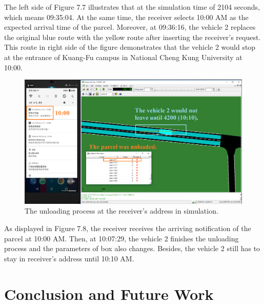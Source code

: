 \documentclass[12pt]{ksthesis}
\begin{document}
\begin{thesis}
{\begin{figure}[H]
\label{Fig:Receiver_request}
\end{figure}

The left side of Figure 7.7 illustrates that at the simulation time of 2104 seconds, which means 09:35:04. At the same time, the receiver selects 10:00 AM as the expected arrival time of the parcel. Moreover, at 09:36:16, the vehicle 2 replaces the original blue route with the yellow route after inserting the receiver’s request. This route in right side of the figure demonstrates that the vehicle 2 would stop at the entrance of Kuang-Fu campus in National Cheng Kung University at 10:00.


\begin{figure}[H]
\centering
\includegraphics[width=1.0\textwidth]{./Thesis_figures/F7-8_unloadingProcess.PNG}
\caption{\large The unloading process at the receiver’s address in simulation.}
\vspace{0.5cm}
\label{Fig:unloading_request}
\end{figure}


As displayed in Figure 7.8, the receiver receives the arriving notification of the parcel at 10:00 AM. Then, at 10:07:29, the vehicle 2 finishes the unloading process and the parameters of box also changes. Besides, the vehicle 2 still has to stay in receiver’s address until 10:10 AM.














\chapter{Conclusion and Future Work} \label{Chap:Conclusion}

}
\end{thesis}
\end{document}
